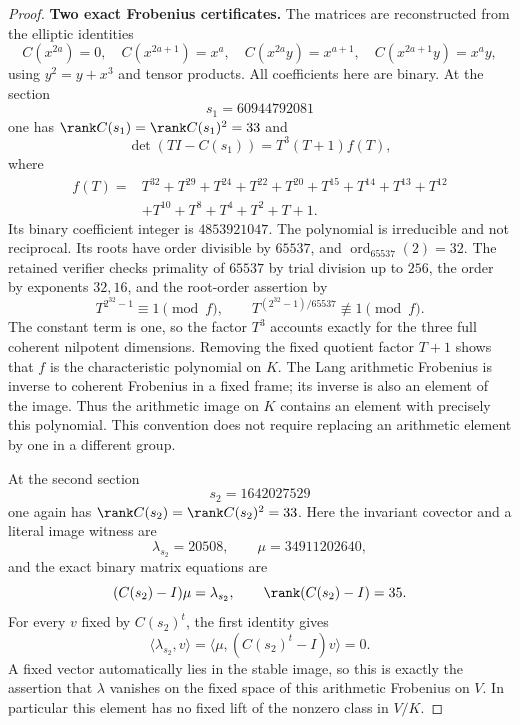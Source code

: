 \begin{proof}
\par\smallskip\noindent\textbf{Two exact Frobenius certificates.}
The matrices are reconstructed from the elliptic identities
\[
 C(x^{2a})=0,\quad C(x^{2a+1})=x^a,\quad
 C(x^{2a}y)=x^{a+1},\quad C(x^{2a+1}y)=x^a y,
\]
using $y^2=y+x^3$ and tensor products. All coefficients here are binary.
At the section
\[
                         s_1=60944792081
\]
one has $\rank C(s_1)=\rank C(s_1)^2=33$ and
\[
 \det(TI-C(s_1))=T^3(T+1)f(T),
\]
where
\begin{align*}
 f(T)={}&T^{32}+T^{29}+T^{24}+T^{22}+T^{20}
       +T^{15}+T^{14}+T^{13}+T^{12}\\
       &+T^{10}+T^8+T^4+T^2+T+1.
\end{align*}
Its binary coefficient integer is $4853921047$.
The polynomial is irreducible and not reciprocal. Its roots have order
divisible by $65537$, and
$\operatorname{ord}_{65537}(2)=32$.
The retained verifier checks primality of $65537$ by trial division up
to $256$, the order by exponents $32,16$, and the root-order assertion by
\[
 T^{2^{32}-1}\equiv1\pmod f,\qquad
 T^{(2^{32}-1)/65537}\not\equiv1\pmod f.
\]
The constant term is one, so the factor $T^3$ accounts exactly for the
three full coherent nilpotent dimensions. Removing the fixed quotient
factor $T+1$ shows that $f$ is the characteristic polynomial on $K$.
The Lang arithmetic Frobenius is inverse to coherent Frobenius in a
fixed frame; its inverse is also an element of the image. Thus the
arithmetic image on $K$ contains an element with precisely this
polynomial. This convention does not require replacing an arithmetic
element by one in a different group.

At the second section
\[
                         s_2=1642027529
\]
one again has $\rank C(s_2)=\rank C(s_2)^2=33$.
Here the invariant covector and a literal image witness are
\[
              \lambda_{s_2}=20508,\qquad \mu=34911202640,
\]
and the exact binary matrix equations are
\begin{equation}\label{eq:ss-degree-two-fixed-lift-obstruction}
 (C(s_2)-I)\mu=\lambda_{s_2},\qquad
 \rank(C(s_2)-I)=35.
\end{equation}
For every $v$ fixed by $C(s_2)^t$, the first identity gives
\[
 \langle\lambda_{s_2},v\rangle
 =\langle\mu,(C(s_2)^t-I)v\rangle=0.
\]
A fixed vector automatically lies in the stable image, so this is
exactly the assertion that $\lambda$ vanishes on the fixed space of
this arithmetic Frobenius on $V$. In particular this element has no
fixed lift of the nonzero class in $V/K$.


\end{proof}
